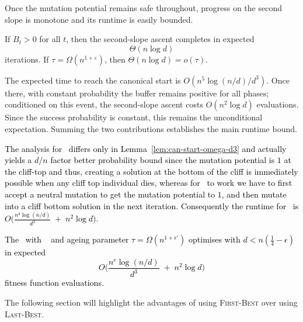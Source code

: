 Once the mutation potential remains safe throughout, progress on the second 
slope is monotone and its runtime is easily bounded.



\begin{lemma}%
	\label{prop:climb-time}
	
	If $B_t>0$ for all $t$, then the second-slope ascent completes in expected
	\[
	\Theta(n\log d)
	\]
	iterations.  
	If $\tau=\Omega(n^{1+\varepsilon})$, then $\Theta(n\log d)=o(\tau)$.
\end{lemma}


The expected time to reach the canonical start is 
$O(n^{5}\log(n/d)/d^{3})$.  
Once there, with constant probability the buffer remains positive for all 
phases; conditioned on this event, the second-slope ascent costs 
$O(n^{2}\log d)$ evaluations.  
Since the success probability is constant, this remains the unconditional 
expectation.  
Summing the two contributions establishes the main runtime bound.

\textcolor{black}{The analysis for \lastBest~differs only in Lemma~\ref{lem:can-start-omega-d3} and actually yields a $d/n$ factor better probability bound since the mutation potential is $1$ at the cliff-top and thus, creating a solution at the bottom of the cliff is immediately possible when any cliff top individual dies, whereas for \firstBest~to work we have to first accept a neutral mutation to get the mutation potential to $1$, and then mutate into a cliff bottom solution in the next iteration. Consequently the runtime for \lastBest~is  
$O\!\Big(\frac{n^{4}\log(n/d)}{d^{2}} \;+\; n^{2}\log d\Big)$.}

\textcolor{black}{
\begin{corollary}
	The %
	\textcolor{black}{\lastBest~with} \linHD\  and ageing parameter $\tau=\Omega(n^{1+\epsilon'})$
	optimises \cliff{} with $d<n(\tfrac{1}{4}-\epsilon)$ in expected
	\[
	O\!\Big(\frac{n^{e}\log(n/d)}{d^{3}} \;+\; n^{2}\log d\Big)
	\]
	fitness function evaluations.
\end{corollary}
}
The following section will highlight the advantages of using \textsc{First-Best} over using \textsc{Last-Best}.
